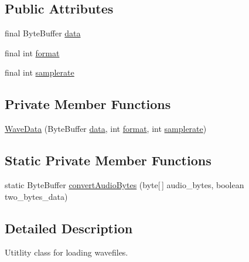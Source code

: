 \subsection*{Public Attributes}
\begin{DoxyCompactItemize}
\item 
final Byte\+Buffer \mbox{\hyperlink{classorg_1_1newdawn_1_1slick_1_1openal_1_1_wave_data_af9383885dad52bb0a58a05b3d6c3fb9a}{data}}
\item 
final int \mbox{\hyperlink{classorg_1_1newdawn_1_1slick_1_1openal_1_1_wave_data_a8468309f99692af493c43e31a1591d18}{format}}
\item 
final int \mbox{\hyperlink{classorg_1_1newdawn_1_1slick_1_1openal_1_1_wave_data_aa8a7b8d65c93fdab24bb923dd0475d6e}{samplerate}}
\end{DoxyCompactItemize}
\subsection*{Private Member Functions}
\begin{DoxyCompactItemize}
\item 
\mbox{\hyperlink{classorg_1_1newdawn_1_1slick_1_1openal_1_1_wave_data_a81d45aa86be7b24411e50b4b7b6bed0d}{Wave\+Data}} (Byte\+Buffer \mbox{\hyperlink{classorg_1_1newdawn_1_1slick_1_1openal_1_1_wave_data_af9383885dad52bb0a58a05b3d6c3fb9a}{data}}, int \mbox{\hyperlink{classorg_1_1newdawn_1_1slick_1_1openal_1_1_wave_data_a8468309f99692af493c43e31a1591d18}{format}}, int \mbox{\hyperlink{classorg_1_1newdawn_1_1slick_1_1openal_1_1_wave_data_aa8a7b8d65c93fdab24bb923dd0475d6e}{samplerate}})
\end{DoxyCompactItemize}
\subsection*{Static Private Member Functions}
\begin{DoxyCompactItemize}
\item 
static Byte\+Buffer \mbox{\hyperlink{classorg_1_1newdawn_1_1slick_1_1openal_1_1_wave_data_aeabccb3f7c90a03c8bde39237f32df34}{convert\+Audio\+Bytes}} (byte\mbox{[}$\,$\mbox{]} audio\+\_\+bytes, boolean two\+\_\+bytes\+\_\+data)
\end{DoxyCompactItemize}


\subsection{Detailed Description}
Utitlity class for loading wavefiles.

